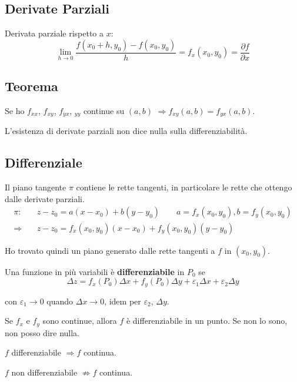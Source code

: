 \documentclass[10pt,a4paper,fleqn]{article}
\begin{document}
	\subsection{Derivate Parziali}

	Derivata parziale rispetto a $x$:
	\begin{equation}
	\lim_{h \to 0} \frac{f(x_0+h, y_0) - f(x_0, y_0)}{h}=f_x(x_0, y_0)=\frac{\partial f}{\partial x}
	\end{equation}

	\subsection{Teorema} 
	
	Se ho $f_{xx}$, $f_{xy}$, $f_{yx}$, $_{yy}$ continue su $(a, b)$ $\Rightarrow f_{xy}(a, b) = f_{yx}(a, b)$.
	
	L'esistenza di derivate parziali non dice nulla sulla differenziabilità.

	\subsection{Differenziale}

	Il piano tangente $\pi$ contiene le rette tangenti, in particolare le rette che ottengo dalle derivate parziali.
	\begin{equation}
	\begin{split}
	\pi:\quad &z-z_0 = a(x-x_0) + b(y-y_0) \qquad a=f_x(x_0, y_0), b=f_y(x_0, y_0)\\
	\Rightarrow\quad &z-z_0 = f_x(x_0, y_0)(x-x_0) + f_y(x_0, y_0)(y-y_0)
	\end{split}
	\end{equation}
	
	Ho trovato quindi un piano generato dalle rette tangenti a $f$ in $(x_0, y_0)$.
	
	Una funzione in più variabili è \textbf{differenziabile} in $P_0$ se
	\[\varDelta z = f_x(P_0)\varDelta x + f_y(P_0)\varDelta y + \varepsilon_1\Delta x + \varepsilon_2\varDelta y \]
	
	con $\varepsilon_1\rightarrow 0$ quando $\varDelta x \rightarrow 0$, idem per $\varepsilon_2$, $\varDelta y$.
	
	Se $f_x$ e $f_y$ sono continue, allora $f$ è differenziabile in un punto. Se non lo sono, non posso dire nulla.
	
	$f$ differenziabile $\Rightarrow f$ continua.
	
	$f$ non differenziabile $\not\Rightarrow f$ continua.
	
\end{document}
